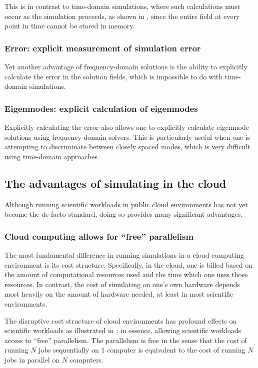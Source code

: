 \documentclass{article}
\begin{document}
This is in contrast to time-domain simulations,
    where such calculations must occur as the simulation proceeds, 
    as shown in ,
    since the entire field at every point in time cannot be stored in memory.

\subsubsection{Error: explicit measurement of simulation error}
Yet another advantage of frequency-domain solutions is the ability
    to explicitly calculate the error in the solution fields,
    which is impossible to do with time-domain simulations.

\subsubsection{Eigenmodes: explicit calculation of eigenmodes}
Explicitly calculating the error also allows one 
    to explicitly calculate eigenmode solutions
    using frequency-domain solvers.
This is particularly useful when one is attempting to
    discriminate between closely spaced modes,
    which is very difficult using time-domain approaches.

\subsection{The advantages of simulating in the cloud}
Although running scientific workloads in public cloud environments
    has not yet become the de facto standard,
    doing so provides many significant advantages.

\subsubsection{Cloud computing allows for ``free'' parallelism}
The most fundamental difference in running simulations
    in a cloud computing environment is its cost structure.
Specifically, in the cloud, 
    one is billed based on the amount of computational resources used
    and the time which one uses those resources.
In contrast, the cost of simulating on one's own hardware
    depends most heavily on the amount of hardware needed,
    at least in most scientific environments.

The disruptive cost structure of cloud environments 
    has profound effects on scientific workloads 
    as illustrated in ;
    in essence, allowing scientific workloads access
    to ``free'' parallelism.
The parallelism is free in the sense that 
    the cost of running $N$ jobs sequentially on $1$ computer is equivalent to 
    the cost of running $N$ jobs in parallel on $N$ computers.
\end{document}
